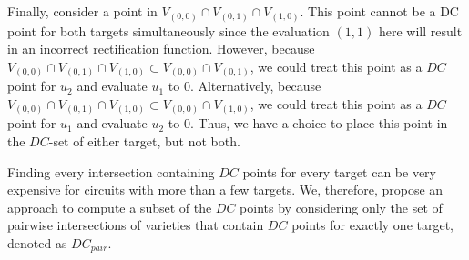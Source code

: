 

Finally, consider a point in $V_{(0,0)} \cap V_{(0,1)} \cap V_{(1,0)}$. 
This point cannot be a DC point for both targets simultaneously 
since the evaluation $(1,1)$ here will result in an incorrect rectification function. 
However, because $V_{(0,0)} \cap V_{(0,1)} \cap V_{(1,0)} \subset V_{(0,0)} \cap V_{(0,1)}$, 
we could treat this point as a $DC$ point for $u_2$ and evaluate $u_1$ to $0$. 
Alternatively, because $V_{(0,0)} \cap V_{(0,1)} \cap V_{(1,0)} \subset V_{(0,0)} \cap V_{(1,0)}$, 
we could treat this point as a $DC$ point for $u_1$ and evaluate $u_2$ to $0$.
Thus, we have a choice to place this point in the $DC$-set of either target, but not both. 



Finding every intersection containing $DC$ points for every target can be very expensive for circuits with more than a few targets. 
We, therefore, propose an approach to compute a subset of the $DC$ points by considering
only the set of pairwise intersections of varieties that contain $DC$ points for exactly one target, denoted as $DC_{pair}$.


